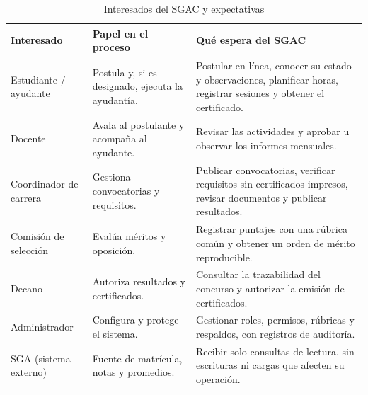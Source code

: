 \begin{table}[htbp]
\centering\small
\caption{Interesados del SGAC y expectativas}
\label{tab:stakeholders}
\begin{tabularx}{\textwidth}{@{}>{\raggedright\arraybackslash}p{3.0cm}>{\raggedright\arraybackslash}p{3.6cm}>{\raggedright\arraybackslash}X@{}}
\toprule
\textbf{Interesado} & \textbf{Papel en el proceso} & \textbf{Qué espera del SGAC}\\
\midrule
Estudiante / ayudante & Postula y, si es designado, ejecuta la ayudantía. & Postular en línea, conocer su estado y observaciones, planificar horas, registrar sesiones y obtener el certificado.\\
Docente & Avala al postulante y acompaña al ayudante. & Revisar las actividades y aprobar u observar los informes mensuales.\\
Coordinador de carrera & Gestiona convocatorias y requisitos. & Publicar convocatorias, verificar requisitos sin certificados impresos, revisar documentos y publicar resultados.\\
Comisión de selección & Evalúa méritos y oposición. & Registrar puntajes con una rúbrica común y obtener un orden de mérito reproducible.\\
Decano & Autoriza resultados y certificados. & Consultar la trazabilidad del concurso y autorizar la emisión de certificados.\\
Administrador & Configura y protege el sistema. & Gestionar roles, permisos, rúbricas y respaldos, con registros de auditoría.\\
SGA (sistema externo) & Fuente de matrícula, notas y promedios. & Recibir solo consultas de lectura, sin escrituras ni cargas que afecten su operación.\\
\bottomrule
\end{tabularx}
\end{table}
